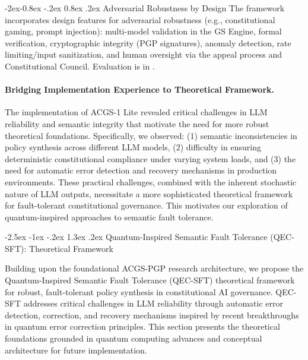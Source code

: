 \documentclass[manuscript,screen,9pt]{acmart}
\makeatletter
\renewcommand\section{\@startsection{section}{1}{\z@}%
  {-2.5ex \@plus -1ex \@minus -.2ex}%
  {1.3ex \@plus.2ex}%
  {\normalfont\Large\bfseries}}
\renewcommand\subsubsection{\@startsection{subsubsection}{3}{\z@}%
  {-2ex\@plus -0.8ex \@minus -.2ex}%
  {0.8ex \@plus .2ex}%
  {\normalfont\normalsize\bfseries}}
\makeatother
\begin{document}
\subsubsection{Adversarial Robustness by Design}
\label{subsubsec:adversarial_robustness_methods}
The framework incorporates design features for adversarial robustness (e.g., constitutional gaming, prompt injection): multi-model validation in the GS Engine, formal verification, cryptographic integrity (PGP signatures), anomaly detection, rate limiting/input sanitization, and human oversight via the appeal process and Constitutional Council. Evaluation is in .

\paragraph{Bridging Implementation Experience to Theoretical Framework.} The implementation of ACGS-1 Lite revealed critical challenges in LLM reliability and semantic integrity that motivate the need for more robust theoretical foundations. Specifically, we observed: (1) semantic inconsistencies in policy synthesis across different LLM models, (2) difficulty in ensuring deterministic constitutional compliance under varying system loads, and (3) the need for automatic error detection and recovery mechanisms in production environments. These practical challenges, combined with the inherent stochastic nature of LLM outputs, necessitate a more sophisticated theoretical framework for fault-tolerant constitutional governance. This motivates our exploration of quantum-inspired approaches to semantic fault tolerance.

\section{Quantum-Inspired Semantic Fault Tolerance (QEC-SFT): Theoretical Framework}
\label{sec:qec_sft}

Building upon the foundational ACGS-PGP research architecture, we propose the Quantum-Inspired Semantic Fault Tolerance (QEC-SFT) theoretical framework for robust, fault-tolerant policy synthesis in constitutional AI governance. QEC-SFT addresses critical challenges in LLM reliability through automatic error detection, correction, and recovery mechanisms inspired by recent breakthroughs in quantum error correction principles. This section presents the theoretical foundations grounded in quantum computing advances and conceptual architecture for future implementation.
\end{document}

